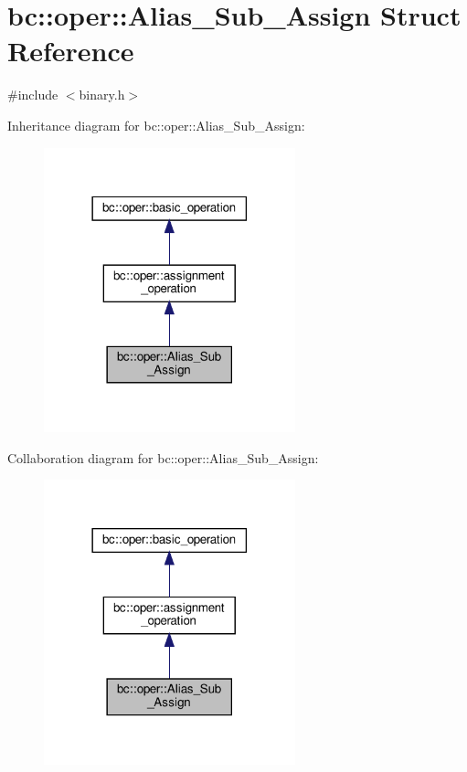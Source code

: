 \hypertarget{structbc_1_1oper_1_1Alias__Sub__Assign}{}\section{bc\+:\+:oper\+:\+:Alias\+\_\+\+Sub\+\_\+\+Assign Struct Reference}
\label{structbc_1_1oper_1_1Alias__Sub__Assign}


{\ttfamily \#include $<$binary.\+h$>$}



Inheritance diagram for bc\+:\+:oper\+:\+:Alias\+\_\+\+Sub\+\_\+\+Assign\+:\nopagebreak
\begin{figure}[H]
\begin{center}
\leavevmode
\includegraphics[width=206pt]{structbc_1_1oper_1_1Alias__Sub__Assign__inherit__graph}
\end{center}
\end{figure}


Collaboration diagram for bc\+:\+:oper\+:\+:Alias\+\_\+\+Sub\+\_\+\+Assign\+:\nopagebreak
\begin{figure}[H]
\begin{center}
\leavevmode
\includegraphics[width=206pt]{structbc_1_1oper_1_1Alias__Sub__Assign__coll__graph}
\end{center}
\end{figure}
